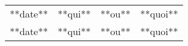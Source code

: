 \small
\begin{tabular}{|p{1.5cm}| >{\raggedright}p{2.5cm}|p{2.5cm}|p{8.5cm}|}
  \hline
 
 \rowcolor{Gainsboro} \color{Navy}{\bfseries Date}  & \color{Navy}{\bfseries Auteur} & \color{Navy}{\bfseries Section(s)}  &\color{Navy}{\bfseries Commentaires} \\
  \hline
**date** & **qui** & **ou** & **quoi**\\
  \hline
**date** & **qui** & **ou** & **quoi**\\
\hline
\end{tabular}
\normalsize
